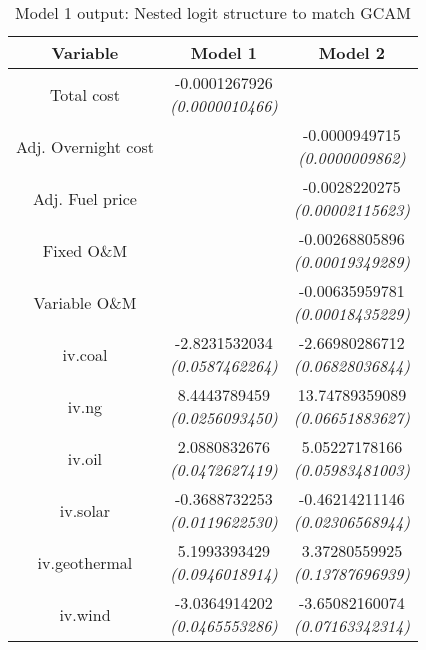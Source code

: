 \documentclass[10pt]{amsart}
\begin{document}
\begin{table}[H]
\caption{Model 1 output: Nested logit structure to match GCAM}
\centering
\begin{tabular}{c c c}
\hline
\hline
Variable & Model 1 & Model 2 \\ [0.5ex]
\hline
Total cost & \makecell{-0.0001267926 \\ {\footnotesize\textit{(0.0000010466)}}} & \\
Adj. Overnight cost & & \makecell{-0.0000949715 \\ {\footnotesize\textit{(0.0000009862)}}} \\
Adj. Fuel price & & \makecell{-0.0028220275 \\ {\footnotesize\textit{(0.00002115623)}}}\\
Fixed O\&M & & \makecell{-0.00268805896 \\ {\footnotesize\textit{(0.00019349289)}}}\\
Variable O\&M & & \makecell{-0.00635959781 \\ {\footnotesize\textit{(0.00018435229)}}}\\
iv.coal & \makecell{-2.8231532034 \\ {\footnotesize\textit{(0.0587462264)}}} & \makecell{-2.66980286712 \\ {\footnotesize\textit{(0.06828036844)}}} \\
iv.ng & \makecell{8.4443789459 \\ {\footnotesize\textit{(0.0256093450)}}} & \makecell{13.74789359089 \\ {\footnotesize\textit{(0.06651883627)}}}\\
iv.oil & \makecell{2.0880832676 \\ {\footnotesize\textit{(0.0472627419)}}} & \makecell{5.05227178166 \\ {\footnotesize\textit{(0.05983481003)}}}\\
iv.solar & \makecell{-0.3688732253 \\ {\footnotesize\textit{(0.0119622530)}}} & \makecell{-0.46214211146 \\ {\footnotesize\textit{(0.02306568944)}}} \\
iv.geothermal & \makecell{5.1993393429 \\ {\footnotesize\textit{(0.0946018914)}}} & \makecell{3.37280559925 \\ {\footnotesize\textit{(0.13787696939)}}}\\
iv.wind & \makecell{-3.0364914202 \\ {\footnotesize\textit{(0.0465553286)}}} & \makecell{-3.65082160074 \\ {\footnotesize\textit{(0.07163342314)}}}\\ [1ex]
\hline
\end{tabular}
\label{table:nl.1}
\end{table}
\end{document}
